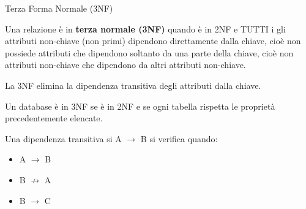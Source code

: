\begin{frame}{Terza Forma Normale (3NF)}
\vspace{-1.5cm}
\begin{minipage}{0.9\textwidth}
Una relazione \`e in \textbf{terza normale (3NF)} quando \`e in 2NF e TUTTI i gli attributi non-chiave (non primi) dipendono direttamente dalla chiave, cio\`e non possiede attributi che dipendono soltanto da una parte della chiave, cio\`e non attributi non-chiave che dipendono da altri attributi non-chiave.
\end{minipage}
\pause

\vspace{.2cm}
La 3NF elimina la dipendenza transitiva degli attributi dalla chiave.

\begin{minipage}{0.7\textwidth}
\vspace{.2cm}
Un database \`e in 3NF se \`e in 2NF e se ogni tabella rispetta le propriet\`a precedentemente elencate.

Una dipendenza transitiva si A $ \rightarrow $ B si verifica quando:
\begin{itemize}
    \item A $ \rightarrow $ B
    \item B $ \not\to $ A
    \item B $ \rightarrow $ C
\end{itemize}
\end{minipage}
\end{frame}
%
